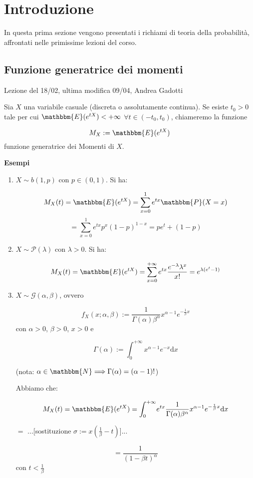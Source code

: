 \section{Introduzione}
In questa prima sezione vengono presentati i richiami di teoria della probabilità, affrontati nelle primissime lezioni del corso.
\subsection{Funzione generatrice dei momenti}
Lezione del 18/02, ultima modifica 09/04, Andrea Gadotti

\begin{definizione}
Sia $X$ una variabile casuale (discreta o assolutamente continua). Se esiste $t_0 > 0$ tale per cui $\mathbbm{E}(e^{tX}) < +\infty$ $\forall t \in (-t_0 , t_0)$, chiameremo la funzione 

$$M_X := \mathbbm{E}(e^{tX})$$
funzione generatrice dei Momenti di $X$.
\end{definizione}
\textbf{Esempi}
\begin{enumerate}
\item $X \sim b(1,p)$ con $p \in (0,1)$. Si ha:

$$M_X (t) 	= \mathbbm{E}(e^{tX}) 
			= \displaystyle\sum_{x=0}^1 e^{tx} \mathbbm{P}(X=x)$$
$$
			= \displaystyle\sum_{x=0}^1 e^{tx} p^x (1-p)^{1-x}
			= p e^t + (1-p)$$	


\item $X \sim \mathcal{P} (\lambda)$ con $\lambda > 0$. Si ha:

$$M_X (t) 	= \mathbbm{E}(e^{tX}) 
			= \displaystyle\sum_{x=0}^{+\infty} e^{tx} \frac{e^{-\lambda} \lambda^x}{x!}
			= e^{\lambda (e^t -1)}$$
			
			
\item $X \sim \mathcal{G} (\alpha, \beta)$, ovvero 

$$f_X (x; \alpha, \beta) := \frac{1}{\Gamma (\alpha) \beta^{\alpha}} x^{\alpha -1} e^{-\frac{1}{\beta} x}$$ con $\alpha>0$, $\beta>0$, $x>0$ e 

$$\Gamma(\alpha) := \int_0^{+\infty} \! x^{\alpha -1} e^{-x} \mathrm{d}x$$ 

(nota: $\alpha \in \mathbbm{N} \Longrightarrow \Gamma(\alpha)=(\alpha - 1)!$)

Abbiamo che: 

$$M_X (t)	= \mathbbm{E}(e^{tX})
			= \int_0^{+\infty} \! e^{tx} \frac{1}{\Gamma (\alpha) \beta^{\alpha}} x^{\alpha -1} e^{-\frac{1}{\beta} x} \mathrm{d}x$$
\begin{center} $=$ ...[sostituzione $\sigma := x(\frac{1}{\beta} - t)$]...  \end{center}
			$$= \frac{1}{(1-\beta t)^{\alpha}}$$ con $t < \frac{1}{\beta}$
			
\end{enumerate}

